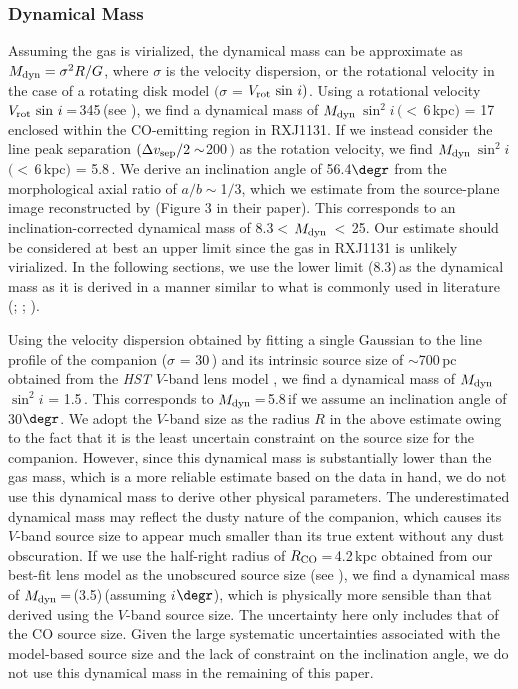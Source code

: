 \documentclass[]{emulateapj}
\begin{document}
\subsubsection{Dynamical Mass}
Assuming the gas is virialized,
the dynamical mass can be approximate as
$M_{\rm dyn} = \sigma^2 R / G$,
where $\sigma$ is the velocity dispersion, or the rotational velocity in the case of a rotating disk model
$($\ie $\sigma$ = $V_{\rm rot}\, \sin\, i)$.
Using a rotational velocity $V_{\rm rot} \, \sin\, i$\,=\,345\,\kms (see ),  %
we find a dynamical mass of
$M_{\rm dyn}$\,$\sin^2 i$\,$(<$\,6\,kpc$)$ = 17\,\Msun enclosed
within the CO-emitting region in RXJ1131.
If we instead consider the
\bco line peak separation $(\Delta v_{\rm sep}/2 \sim$200\,\kms$)$ as the rotation velocity, we find
$M_{\rm dyn}$\,$\sin^2 i$\,$(<$\,6\,kpc$)$ = 5.8\,\Msun. %
We derive an inclination angle of 56.4$\degr$ from the
morphological axial ratio of $a/b\sim$1$/$3, which we estimate
from the source-plane image reconstructed by  (Figure 3 in their paper).  
This corresponds to an inclination-corrected dynamical mass of
8.3\Msun$<$\,$M_{\rm dyn}$\,$<$\,25\Msun.
Our estimate should be considered at best an upper limit since
the gas in RXJ1131 is unlikely virialized.
In the following sections, we use the
lower limit (8.3)\,\Msun as the dynamical mass as it is
derived in a manner similar to what is commonly used in literature 
(\eg {}; \citealt[hereafter DS98]{Downes98a}; ).

Using the velocity dispersion obtained by fitting a single Gaussian to the
line profile of the companion ($\sigma$ = 30\,\kms)
and its intrinsic source size of $\sim$700\,pc obtained from the {\em HST}
$V$-band lens model ,
we find a dynamical mass of $M_{\rm dyn}$\,$\sin^2 i$ = 1.5\,\Msun.
This corresponds to $M_{\rm dyn}$\,=\,5.8\,\Msun if we assume an
inclination angle of 30$\degr$.
We adopt the $V$-band size as the radius $R$ in the above estimate 
owing to the fact that it is the least uncertain constraint on the source size for the companion.
However, since this dynamical mass is substantially lower than the gas mass, which is 
a more reliable estimate based on the data in hand, 
we do not use this dynamical mass to derive other physical parameters.
The underestimated dynamical mass may reflect
the dusty nature of the companion, which causes its $V$-band source size to 
appear much smaller than its true extent without any dust obscuration. 
If we use the half-right radius of $R_{\rm CO}$\,=\,4.2\,kpc obtained from our best-fit lens 
model as the unobscured source size (see ), we find a dynamical mass of 
$M_{\rm dyn}$\,=\,(3.5)\,\Msun (assuming $i$$\degr$), which is physically more sensible 
than that derived using the $V$-band source size. 
The uncertainty here only includes that of the CO source size.
Given the large systematic uncertainties associated with the model-based source size and
the lack of constraint on the inclination angle, we do not use this dynamical mass in the remaining of this paper.
\end{document}
